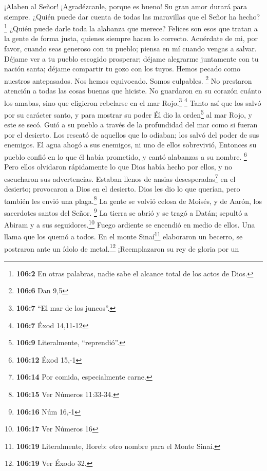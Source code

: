  ¡Alaben al Señor! ¡Agradézcanle, porque es bueno! Su gran
amor durará para siempre.  ¿Quién puede dar cuenta de
todas las maravillas que el Señor ha hecho?\footnote{\textbf{106:2} En
  otras palabras, nadie sabe el alcance total de los actos de Dios.}
¿Quién puede darle toda la alabanza que merece?  Felices
son esos que tratan a la gente de forma justa, quienes siempre hacen lo
correcto.  Acuérdate de mi, por favor, cuando seas
generoso con tu pueblo; piensa en mí cuando vengas a salvar.
 Déjame ver a tu pueblo escogido prosperar; déjame
alegrarme juntamente con tu nación santa; déjame compartir tu gozo con
los tuyos.  Hemos pecado como nuestros antepasados. Nos
hemos equivocado. Somos culpables. \footnote{\textbf{106:6} Dan 9,5}
 No prestaron atención a todas las cosas buenas que
hiciste. No guardaron en su corazón cuánto los amabas, sino que
eligieron rebelarse en el mar Rojo.\footnote{\textbf{106:7} ``El mar de
  los juncos''.} \footnote{\textbf{106:7} Éxod 14,11-12} 
Tanto así que los salvó por su carácter santo, y para mostrar su poder
 Él dio la orden\footnote{\textbf{106:9} Literalmente,
  ``reprendió''.} al mar Rojo, y este se secó. Guió a su pueblo a través
de la profundidad del mar como si fueran por el desierto.
 Los rescató de aquellos que lo odiaban; los salvó del
poder de sus enemigos.  El agua ahogó a sus enemigos, ni
uno de ellos sobrevivió,  Entonces su pueblo confió en lo
que él había prometido, y cantó alabanzas a su nombre. \footnote{\textbf{106:12}
  Éxod 15,-1}  Pero ellos olvidaron rápidamente lo que
Dios había hecho por ellos, y no escucharon sus advertencias.
 Estaban llenos de ansias desesperadas\footnote{\textbf{106:14}
  Por comida, especialmente carne.} en el desierto; provocaron a Dios en
el desierto.  Dios les dio lo que querían, pero también
les envió una plaga.\footnote{\textbf{106:15} Ver Números 11:33-34.}
 La gente se volvió celosa de Moisés, y de Aarón, los
sacerdotes santos del Señor. \footnote{\textbf{106:16} Núm 16,-1}
 La tierra se abrió y se tragó a Datán; sepultó a Abiram
y a sus seguidores.\footnote{\textbf{106:17} Ver Números 16}
 Fuego ardiente se encendió en medio de ellos. Una llama
que los quemó a todos.  En el monte Sinaí\footnote{\textbf{106:19}
  Literalmente, Horeb: otro nombre para el Monte Sinaí.} elaboraron un
becerro, se postraron ante un ídolo de metal.\footnote{\textbf{106:19}
  Ver Éxodo 32.}  ¡Reemplazaron su rey de gloria por un
